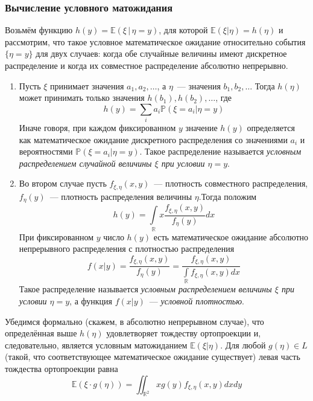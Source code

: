    \subsubsection{Вычисление условного матожидания}
    Возьмём функцию $h(y)=\mathbb{E}(\xi \,|\, \eta=y)$, для которой $\mathbb{E}(\xi | \eta)=h(\eta)$ и рассмотрим, что такое условное математическое ожидание относительно события $\{\eta=y\}$ для двух случаев: когда обе случайные величины имеют дискретное распределение и когда их совместное распределение абсолютно непрерывно.
    \begin{enumerate}
        \item Пусть $\xi$ принимает значения $a_{1}, a_{2}, \ldots$, а $\eta$~--- значения $b_{1}, b_{2}, \ldots$ Тогда $h(\eta)$ может принимать только значения $h\left(b_{1}\right), h\left(b_{2}\right), \ldots$, где
        \begin{equation*}
            h(y)=\sum\limits_{i} a_{i} \mathbb{P}\left(\xi=a_{i} | \eta=y\right)
        \end{equation*}
        Иначе говоря, при каждом фиксированном $y$ значение $h(y)$ определяется как математическое ожидание дискретного распределения со значениями $a_{i}$ и вероятностями $\mathbb{P}\left(\xi=a_{i} | \eta=y\right)$. Такое распределение называется \textit{условным распределением случайной величины $\xi$ при условии $\eta = y$}.
        
        \item Во втором случае пусть $f_{\xi, \eta}(x, y)$~--- плотность совместного распределения, $f_{\eta}(y)$~--- плотность распределения величины $\eta$.Тогда положим
        \begin{equation*}
            h(y)=\int\limits_{\mathbb{R}} x \frac{f_{\xi, \eta}(x, y)}{f_{\eta}(y)} d x
        \end{equation*}
        При фиксированном $y$ число $h(y)$ есть математическое ожидание абсолютно непрерывного распределения с плотностью распределения
        \begin{equation*}
            f(x | y)=\frac{f_{\xi, \eta}(x, y)}{f_{\eta}(y)}=\frac{f_{\xi, \eta}(x, y)}{\int\limits_{\mathbb{R}} f_{\xi, \eta}(x, y) d x}
        \end{equation*}
        Такое распределение называется \textit{условным распределением величины $\xi$ при условии $\eta = y$}, а функция $f(x | y)$~--- \textit{условной плотностью}.
    \end{enumerate}
    

        Убедимся формально (скажем, в абсолютно непрерывном случае), что определённая выше $h(\eta)$ удовлетворяет тождеству ортопроекции и, следовательно, является условным матожиданием $\mathbb{E}(\xi | \eta)$. Для любой $g(\eta) \in L$ (такой, что соответствующее математическое ожидание существует) левая часть тождества ортопроекции равна
        \begin{equation*}
            \mathbb{E}(\xi \cdot g(\eta))=\iint_{\mathbb{R}^{2}} x g(y) f_{\xi, \eta}(x, y) d x d y
        \end{equation*}
        
